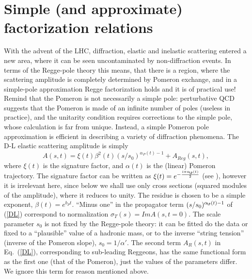 \documentclass[12pt]{article}
\begin{document}
\section{Simple (and approximate) factorization relations} \label{sec:Factor}
With the advent of the LHC, diffraction, elastic and inelastic scattering entered a new area, where it can be seen uncontaminated by non-diffraction
events. In terms of the Regge-pole theory this means, that there is a region, where the scattering amplitude is completely determined by Pomeron exchange, and in a
simple-pole approximation Regge factorization holds and it is of practical use! Remind that the Pomeron is not necessarily a simple pole:
perturbative QCD suggests that the Pomeron is made of an infinite number of poles (useless in practice), and the unitarity condition requires corrections
to the simple pole, whose calculation is far from unique. Instead, a simple Pomeron pole approximation \cite{DL} is efficient in describing
a variety of diffraction phenomena.
%
The D-L elastic scattering amplitude \cite{DL} is simply
\begin{equation}\label{DL}
A(s,t)=\xi(t)\beta^2(t)(s/s_0)^{\alpha_P(t)-1}+A_{Reg}(s,t),
\end{equation}
where $\xi(t)$ is the signature factor, and $\alpha(t)$ is the (linear) Pomeron trajectory. The signature factor can be
written as $\xi(t)=e^{-\frac{i\pi\alpha_{\!\P}(t)}{2}}$ (see \cite{PR}), however it is irrelevant here, since below we shall use only cross sections (squared modules of the amplitude), where it reduces to unity. The residue is chosen to be a simple exponent, $\beta(t)=e^{b_Pt}$.
``Minus one'' in the propagator term $(s/s_0)^{\alpha_{\!\P}(t)-1}$ of (\ref{DL}) correspond to normalization $\sigma_T(s)=Im A(s,t=0)$. The scale parameter $s_0$ is not fixed by the Regge-pole theory: it can be fitted do the data or fixed to a ``plausible'' value of a hadronic mass, or to the inverse ``string tension'' (inverse of the Pomeron slope), $s_0=1/\alpha'$. The second term $A_R(s,t)$ in Eq.~(\ref{DL}), corresponding to sub-leading Reggeons, has the same functional form as the first one (that of the Pomeron), just the values of the parameters differ.
We ignore this term for reason mentioned above.
\end{document}
